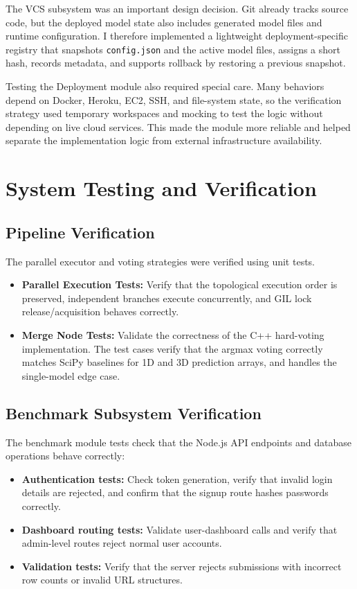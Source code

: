 \documentclass[12pt,a4paper,oneside]{report}
\begin{document}
The VCS subsystem was an important design decision. Git already tracks source code, but the deployed model state also includes generated model files and runtime configuration. I therefore implemented a lightweight deployment-specific registry that snapshots \texttt{config.json} and the active model files, assigns a short hash, records metadata, and supports rollback by restoring a previous snapshot.

Testing the Deployment module also required special care. Many behaviors depend on Docker, Heroku, EC2, SSH, and file-system state, so the verification strategy used temporary workspaces and mocking to test the logic without depending on live cloud services. This made the module more reliable and helped separate the implementation logic from external infrastructure availability.

\chapter{System Testing and Verification}
\label{chap:verification}

\section{Pipeline Verification}
The parallel executor and voting strategies were verified using unit tests.
\begin{itemize}[leftmargin=*]
    \item \textbf{Parallel Execution Tests:} Verify that the topological execution order is preserved, independent branches execute concurrently, and GIL lock release/acquisition behaves correctly.
    \item \textbf{Merge Node Tests:} Validate the correctness of the C++ hard-voting implementation. The test cases verify that the argmax voting correctly matches SciPy baselines for 1D and 3D prediction arrays, and handles the single-model edge case.
\end{itemize}

\section{Benchmark Subsystem Verification}
The benchmark module tests check that the Node.js API endpoints and database operations behave correctly:
\begin{itemize}[leftmargin=*]
    \item \textbf{Authentication tests:} Check token generation, verify that invalid login details are rejected, and confirm that the signup route hashes passwords correctly.
    \item \textbf{Dashboard routing tests:} Validate user-dashboard calls and verify that admin-level routes reject normal user accounts.
    \item \textbf{Validation tests:} Verify that the server rejects submissions with incorrect row counts or invalid URL structures.
\end{itemize}
\end{document}
